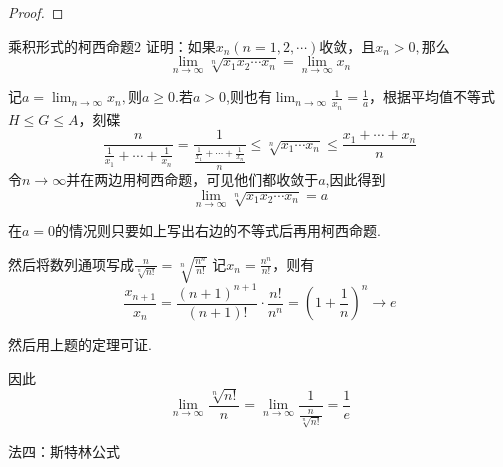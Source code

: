 \begin{xiti}
\begin{solution}
\begin{enumerate}
\begin{proof}
				\end{proof}
		\begin{theorem}{乘积形式的柯西命题}{2}
			证明：如果$x_n(n=1,2,\cdots )$收敛，且$x_n>0,$那么
			$$ 
			\lim _{n \rightarrow \infty} \sqrt[n]{x_{1} x_{2} \cdots x_{n}}=\lim _{n \rightarrow \infty} x_{n}
			$$
		\end{theorem}
			\begin{solution}
			记$a=\lim_{n \rightarrow \infty}x_n,$则$a\geq 0$.若$a> 0$,则也有$\lim_{n \rightarrow \infty}\frac{1}{x_n}
			=\frac{1}{a}$，根据平均值不等式$H\leq G\leq A$，刻碟
			\[\frac{n}{\frac{1}{x_{1}}+\cdots+\frac{1}{x_{n}}}=\frac{1}{\frac{\frac{1}{x_{1}}+\cdots+\frac{1}{x_{n}}}{n}} \leqslant \sqrt[n]{x_{1} \cdots x_{n}} \leqslant \frac{x_{1}+\cdots+x_{n}}{n}\]
			令$n\rightarrow \infty$并在两边用柯西命题，可见他们都收敛于$a$,因此得到
			$$ 
			\lim _{n \rightarrow \infty} \sqrt[n]{x_{1} x_{2} \cdots x_{n}}=a
			$$
			
			在$a=0$的情况则只要如上写出右边的不等式后再用柯西命题.
		\end{solution}
	然后将数列通项写成$\frac{n}{\sqrt[n]{n !}}=\sqrt[n]{\frac{n^{n}}{n !}}$
	记$x_n=\frac{n^n}{n!}$，则有
	\[\frac{x_{n+1}}{x_{n}}=\frac{(n+1)^{n+1}}{(n+1) !} \cdot \frac{n !}{n^{n}}=\left(1+\frac{1}{n}\right)^{n} \rightarrow e\]
	
	然后用上题的定理可证.
	
	\begin{note}
		因此
		$$\lim_{n \rightarrow \infty}\frac{\sqrt[n]{n!}}{n}=
		\lim_{n \rightarrow \infty}\frac{1}{\frac{n}{\sqrt[n]{n!}}}=\frac{1}{e}$$
		
	\end{note}
	
	法四：斯特林公式
	

\end{enumerate}
\end{solution}
\end{xiti}
